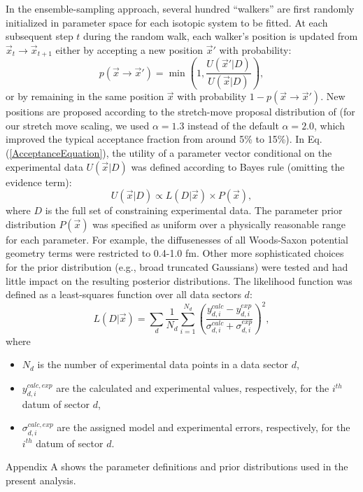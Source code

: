 \documentclass[twocolumn,secnumarabic,amssymb, nobibnotes, aps, prl,
superscriptaddress, nobalancelastpage, floatfix]{revtex4}
\begin{document}
In the ensemble-sampling approach, several hundred
``walkers'' are first randomly initialized in parameter space for each isotopic system to be 
fitted. At each subsequent step $t$ during the
random walk, each walker's position is updated from $\vec{x}_{t} \rightarrow
\vec{x}_{t+1}$ either by accepting a new position $\vec{x}'$ with probability:
\begin{equation}\label{AcceptanceEquation}
    p(\vec{x}\rightarrow \vec{x}') = \min(1,\frac{U(\vec{x}'|D)}{U(\vec{x}|D)}),
\end{equation}
or by remaining in the same position $\vec{x}$ with probability
$1-p(\vec{x}\rightarrow \vec{x}')$. New positions are proposed according
to the stretch-move proposal distribution of \cite{Goodman2010} (for our stretch
move scaling, we used $\alpha = 1.3$ instead of the default $\alpha = 2.0$, which improved the
typical acceptance fraction from around 5\% to 15\%). In Eq.
(\ref{AcceptanceEquation}), the utility of a parameter vector conditional on the
experimental data $U(\vec{x}|D)$ was defined according to Bayes rule (omitting the
evidence term):
\begin{equation}
    U(\vec{x}|D) \propto L(D|\vec{x}) \times P(\vec{x}),
\end{equation}
where $D$ is the full set of constraining experimental data. The parameter prior distribution
$P(\vec{x})$ was specified as uniform over a
physically reasonable range for each parameter. For example, the
diffusenesses of all Woods-Saxon potential geometry terms were restricted
to 0.4-1.0 fm. Other more sophisticated choices for the prior distribution (e.g., broad truncated
Gaussians) were tested and had little impact on the resulting posterior distributions.
The likelihood function was defined as a least-squares function over all data sectors $d$:
\begin{equation} \label{LikelihoodFunction}
    L(D|\vec{x}) = \sum_{d} \frac{1}{N_{d}} \sum_{i=1}^{N_{d}}
    \left(\frac{y^{calc}_{d,i}-y^{exp}_{d,i}}{\sigma^{calc}_{d,i}+\sigma^{exp}_{d,i}}\right)^{2},
\end{equation}
where
\begin{itemize}
    \item $N_{d}$ is the number of experimental data points in a data sector $d$,
    \item $y^{calc, exp}_{d,i}$ are the calculated and experimental values,
        respectively, for the $i^{th}$ datum of sector $d$,
    \item $\sigma^{calc, exp}_{d,i}$ are the assigned model and experimental errors,
        respectively, for the $i^{th}$ datum of sector $d$.
\end{itemize}
Appendix A shows the parameter definitions and prior distributions used in the present
analysis.
\end{document}

